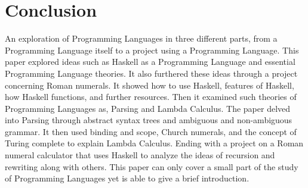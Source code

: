 \documentclass{article}
\begin{document}
\section{Conclusion}\label{conclusion}
An exploration of Programming Languages in three different parts, from a Programming Language itself to a project using a Programming Language. This paper explored ideas such as Haskell as a Programming Language and essential Programming Language theories. It also furthered these ideas through a project concerning Roman numerals. It showed how to use Haskell, features of Haskell, how Haskell functions, and further resources. Then it examined such theories of Programming Languages as, Parsing and Lambda Calculus. The paper delved into Parsing through abstract syntax trees and ambiguous and non-ambiguous grammar. It then used binding and scope, Church numerals, and the concept of Turing complete to explain Lambda Calculus. Ending with a project on a Roman numeral calculator that uses Haskell to analyze the ideas of recursion and rewriting along with others. This paper can only cover a small part of the study of Programming Languages yet is able to give a brief introduction.

\break
\end{document}
